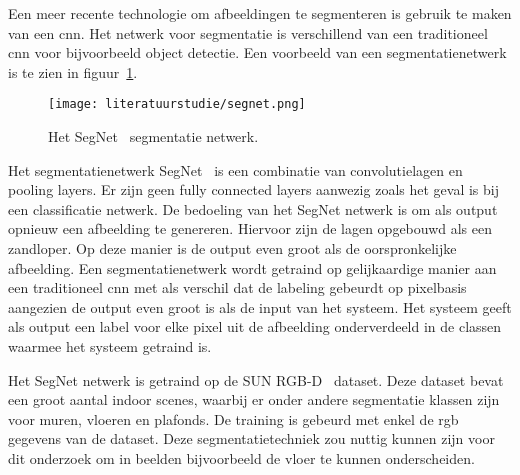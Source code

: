         Een meer recente technologie om afbeeldingen te segmenteren is gebruik te maken van een \gls{cnn}. Het netwerk voor segmentatie is verschillend van een traditioneel \gls{cnn} voor bijvoorbeeld object detectie.
        Een voorbeeld van een segmentatienetwerk is te zien in figuur~\ref{fig:segnet_cnn}.

        \begin{figure}[!htb]
            \centering
            \texttt{[image: literatuurstudie/segnet.png]}
            \caption{Het SegNet~\cite{Badrinarayanan} segmentatie netwerk.}
            \label{fig:segnet_cnn}
        \end{figure}

        Het segmentatienetwerk SegNet~\cite{Badrinarayanan} is een combinatie van convolutielagen en pooling layers. Er zijn geen fully connected layers aanwezig zoals het geval is bij een classificatie netwerk.
        De bedoeling van het SegNet netwerk is om als output opnieuw een afbeelding te genereren. Hiervoor zijn de lagen opgebouwd als een zandloper. Op deze manier is de output even groot als de oorspronkelijke afbeelding.
        Een segmentatienetwerk wordt getraind op gelijkaardige manier aan een traditioneel \gls{cnn} met als verschil dat de labeling gebeurdt op pixelbasis aangezien de output even groot is als de input van het systeem.
        Het systeem geeft als output een label voor elke pixel uit de afbeelding onderverdeeld in de classen waarmee het systeem getraind is.

        Het SegNet netwerk is getraind op de SUN RGB-D~\cite{Song_2015_CVPR} dataset. Deze dataset bevat een groot aantal indoor scenes, waarbij er onder andere segmentatie klassen zijn voor muren, vloeren en plafonds.
        De training is gebeurd met enkel de \gls{rgb} gegevens van de dataset.
        Deze segmentatietechniek zou nuttig kunnen zijn voor dit onderzoek om in beelden bijvoorbeeld de vloer te kunnen onderscheiden.

